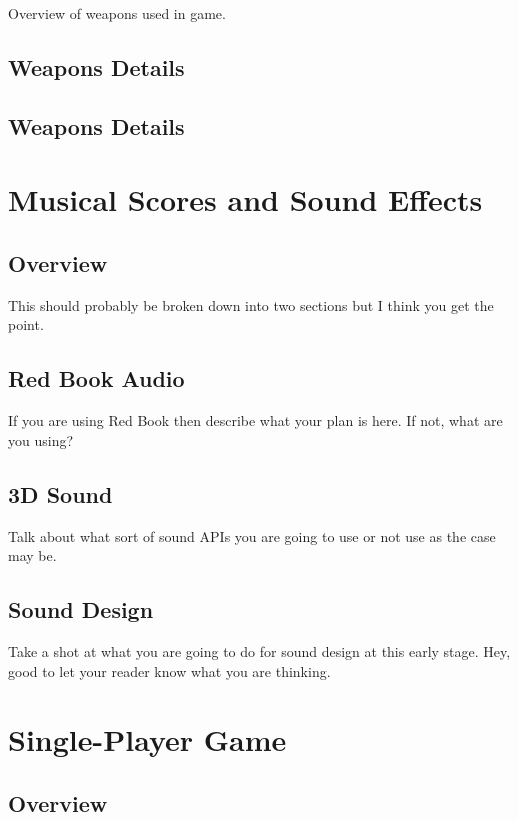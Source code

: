 \documentclass[a4paper]{report}
\begin{document}
		Overview of weapons used in game.

	\section{Weapons Details}

	\section{Weapons Details}


\chapter{Musical Scores and Sound Effects}

	\section{Overview}

		This should probably be broken down into two sections but I think you get the point.	

	\section{Red Book Audio}

		If you are using Red Book then describe what your plan is here.  If not, what are you using?	

	\section{3D Sound}

		Talk about what sort of sound APIs you are going to use or not use as the case may be.	

	\section{Sound Design}

		Take a shot at what you are going to do for sound design at this early stage.  Hey, good to let your reader know what you are thinking.

\chapter{Single-Player Game}

	\section{Overview}
\end{document}
